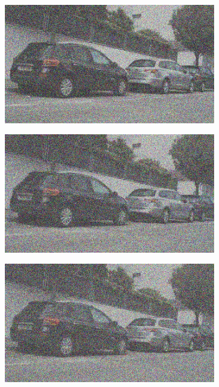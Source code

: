 \documentclass[a4paper]{ctexart}
\begin{document}
\begin{figure}[htbp]
\begin{subfigure}{0.08\textwidth}
				\label{fig：Gamma=0.6, Gauss Noise = 0.7}
			\end{subfigure}
			\begin{subfigure}{0.08\textwidth}
				\captionsetup{font=scriptsize}
				\includegraphics[width=\linewidth]{picture/Edge Detection/degrade/RGB_001 Gamma=0.6, Gauss Noise=0.8}
				\label{fig：Gamma=0.6, Gauss Noise = 0.8}
			\end{subfigure}
			\begin{subfigure}{0.08\textwidth}
				\captionsetup{font=scriptsize}
				\includegraphics[width=\linewidth]{picture/Edge Detection/degrade/RGB_001 Gamma=0.6, Gauss Noise=0.9}
				\label{fig：Gamma=0.6, Gauss Noise = 0.9}
			\end{subfigure}
			\begin{subfigure}{0.08\textwidth}
				\captionsetup{font=scriptsize}
				\includegraphics[width=\linewidth]{picture/Edge Detection/degrade/RGB_001 Gamma=0.6, Gauss Noise=1.0}

\end{subfigure}
\end{figure}
\end{document}
